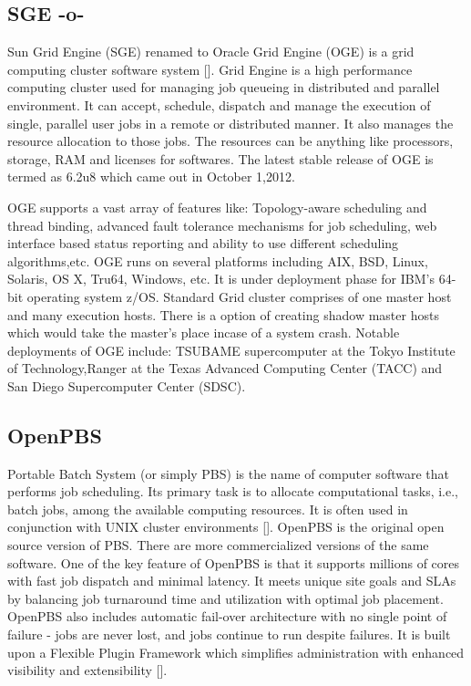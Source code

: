      
\subsection{SGE -o-}

Sun Grid Engine (SGE) renamed to Oracle Grid Engine (OGE) is a grid
computing cluster software system [\cite{www-sge-wiki}]. Grid Engine is
a high performance computing cluster used for managing job queueing in
distributed and parallel environment. It can accept, schedule,
dispatch and manage the execution of single, parallel user jobs in a
remote or distributed manner. It also manages the resource allocation
to those jobs. The resources can be anything like processors, storage,
RAM and licenses for softwares. The latest stable release of OGE is
termed as 6.2u8 which came out in October 1,2012.

OGE supports a vast array of features like: Topology-aware scheduling
and thread binding, advanced fault tolerance mechanisms for job
scheduling, web interface based status reporting and ability to use
different scheduling algorithms,etc. OGE runs on several platforms
including AIX, BSD, Linux, Solaris, OS X, Tru64, Windows, etc. It is
under deployment phase for IBM's 64-bit operating system
z/OS. Standard Grid cluster comprises of one master host and many
execution hosts. There is a option of creating shadow master hosts
which would take the master's place incase of a system crash. Notable
deployments of OGE include: TSUBAME supercomputer at the Tokyo
Institute of Technology,Ranger at the Texas Advanced Computing Center
(TACC) and San Diego Supercomputer Center (SDSC).



\subsection{OpenPBS}

Portable Batch System (or simply PBS) is the name of computer software
that performs job scheduling. Its primary task is to allocate
computational tasks, i.e., batch jobs, among the available computing
resources. It is often used in conjunction with UNIX cluster
environments [\cite{openpbs-wiki}]. OpenPBS is the original open source
version of PBS. There are more commercialized versions of the same
software. One of the key feature of OpenPBS is that it supports
millions of cores with fast job dispatch and minimal latency. It meets
unique site goals and SLAs by balancing job turnaround time and
utilization with optimal job placement. OpenPBS also includes
automatic fail-over architecture with no single point of failure -
jobs are never lost, and jobs continue to run despite failures. It is
built upon a Flexible Plugin Framework which simplifies administration
with enhanced visibility and extensibility [\cite{openpbs-www}].

